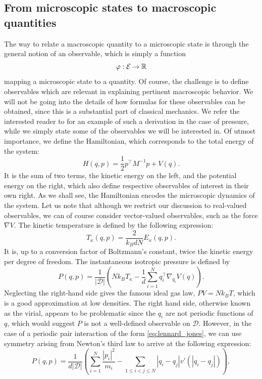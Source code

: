 \subsection{From microscopic states to macroscopic quantities}
The way to relate a macroscopic quantity to a microscopic state is through the general notion of an observable, which is simply a function
\[\varphi : \mathcal E \to \mathbb{R} \]
mapping a microscopic state to a quantity. Of course, the challenge is to define observables which are relevant in explaining pertinent macroscopic behavior.
We will not be going into the details of how formulas for these observables can be obtained, since this is a substantial part of classical mechanics. 
We refer the interested reader to \cite[Section 5.7]{T10} for an example of such a derivation in the case of pressure, while we simply state some of the observables we will be interested in.
Of utmost importance, we define the Hamiltonian, which corresponds to the total energy of the system:
\begin{equation}
    \label{eq:hamiltonian}
    H(q,p)=\frac12 p^\intercal M^{-1}p + V(q).
\end{equation}
It is the sum of two terms, the kinetic energy on the left, and the potential energy on the right, which also define respective observables of interest in their own right.
As we shall see, the Hamiltonian encodes the microscopic dynamics of the system. 
Let us note that although we restrict our discussion to real-valued observables, we can of course consider vector-valued observables, such as the force $\nabla V$.
The kinetic temperature is defined by the following expression:
$$T_\kappa (q,p)= \frac{2}{k_BdN}E_\kappa(q,p).$$
It is, up to a conversion factor of Boltzmann's constant, twice the kinetic energy per degree of freedom.
The instantaneous isotropic pressure is defined by
$$P(q,p)=\frac{1}{|\mathcal D|}\left( Nk_B T_{\kappa} -\frac1d\sum_{i=1}^N q_i^\intercal\nabla_{q_i}V(q)\right).$$
Neglecting the right-hand side gives the famous ideal gas law, $PV=Nk_BT$, which is a good approximation at low densities. The right hand side, otherwise known as the virial, appears to be problematic since the $q_i$ are not periodic functions of $q$, which would suggest $P$ is not a well-defined observable on $\mathcal D$.
However, in the case of a periodic pair interaction of the form \eqref{eq:lennard_jones}, we can use symmetry arising from Newton's third law to arrive at the following expression:
\begin{equation}\label{eq:pressure}P(q,p)=\frac1{d|\mathcal D|}\left( \sum_{i=1}^N \frac{|p_i|^2}{m_i}-\sum_{1\leq i < j\leq N}|q_i-q_j|v'(|q_i-q_j|)\right),\end{equation}


